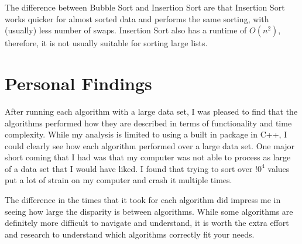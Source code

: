 \documentclass[proceedings]{IEEEtran}
\begin{document}
The difference between Bubble Sort and Insertion Sort are that Insertion Sort works quicker for almost sorted data and performs the same sorting, with (usually) less number of swaps. Insertion Sort also has a runtime of $O(n^2)$, therefore, it is not usually suitable for sorting large lists.

\section{Personal Findings}
After running each algorithm with a large data set, I was pleased to find that the algorithms performed how they are described in terms of functionality and time complexity. While my analysis is limited to using a built in package in C++, I could clearly see how each algorithm performed over a large data set. One major short coming that I had was that my computer was not able to process as large of a data set that I would have liked. I found that trying to sort over $!0^4$ values put a lot of strain on my computer and crash it multiple times. 

The difference in the times that it took for each algorithm did impress me in seeing how large the disparity is between algorithms. While some algorithms are definitely more difficult to navigate and understand, it is worth the extra effort and research to understand which algorithms correctly fit your needs.
\end{document}
